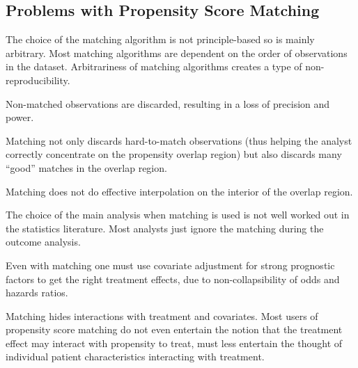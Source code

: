 \subsection{Problems with Propensity Score Matching}
\bi
\item The choice of the matching algorithm is not principle-based so
  is mainly arbitrary.  Most matching algorithms are dependent on the
  order of observations in the dataset.  Arbitrariness of matching
  algorithms creates a type of non-reproducibility. 
\item Non-matched observations are discarded, resulting in a loss of
  precision and power.
\item Matching not only discards hard-to-match observations (thus
  helping the analyst correctly concentrate on the propensity overlap
  region) but also discards many ``good'' matches in the overlap
  region.
\item Matching does not do effective interpolation on the interior of
  the overlap region.
\item The choice of the main analysis when matching is used is not
  well worked out in the statistics literature.  Most analysts just
  ignore the matching during the outcome analysis.
\item Even with matching one must use covariate adjustment for strong
  prognostic factors to get the right treatment effects, due to
  non-collapsibility of odds and hazards ratios.
\item Matching hides interactions with treatment and covariates.
\ei
Most users of propensity score matching do not even entertain the
notion that the treatment effect may interact with propensity to
treat, must less entertain the thought of individual patient
characteristics interacting with treatment.

